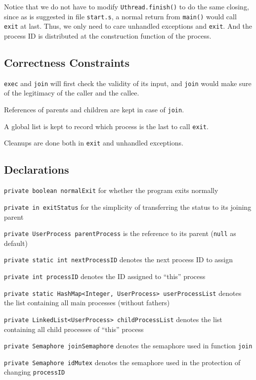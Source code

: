\documentclass{article}
\begin{document}
\begin{spacing}{1.1}
Notice that we do not have to modify \texttt{Uthread.finish()} to do the same closing, since as is suggested in file \texttt{start.s}, a normal return from \texttt{main()} would call \texttt{exit} at last. Thus, we only need to care unhandled exceptions and \texttt{exit}. And the process ID is distributed at the construction function of the process.
\subsection{Correctness Constraints}
\begin{asparaitem}
  \item \texttt{exec} and \texttt{join} will first check the validity of its input, and \texttt{join} would make sure of the legitimacy of the caller and the callee.
  \item References of parents and children are kept in case of \texttt{join}.
  \item A global list is kept to record which process is the last to call \texttt{exit}.
  \item Cleanups are done both in \texttt{exit} and unhandled exceptions.
\end{asparaitem}
\subsection{Declarations}
\texttt{private boolean normalExit} for whether the program exits normally

\texttt{private in exitStatus} for the simplicity of transferring the status to its joining parent

\texttt{private UserProcess parentProcess} is the reference to its parent (\texttt{null} as default)

\texttt{private static int nextProcessID} denotes the next process ID to assign

\texttt{private int processID} denotes the ID assigned to ``this'' process

\texttt{private static HashMap<Integer, UserProcess> userProcessList} denotes the list containing all main processes (without fathers)

\texttt{private LinkedList<UserProcess> childProcessList} denotes the list containing all child processes of ``this'' process

\texttt{private Semaphore joinSemaphore} denotes the semaphore used in function \texttt{join}

\texttt{private Semaphore idMutex} denotes the semaphore used in the protection of changing \texttt{processID}


\end{spacing}
\end{document}
